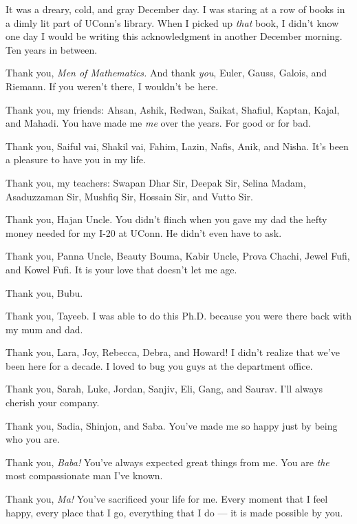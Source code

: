 
  It was a dreary, cold, and gray December day. I was staring at a row of books 
  in a dimly lit part of UConn's library. When I picked up \emph{that} book, I didn't 
  know one day I would be writing this acknowledgment in another December morning. 
  Ten years in between.

  Thank you, \emph{Men of Mathematics.} And thank \emph{you}, 
  Euler, Gauss, Galois, and Riemann. If you weren't there, 
  I wouldn't be here.

  Thank you, my friends: Ahsan, Ashik, Redwan, Saikat, Shafiul, Kaptan, Kajal, and Mahadi. 
  You have made me \emph{me} over the years. For good or for bad.

  Thank you, Saiful vai, Shakil vai, Fahim, Lazin, Nafis, Anik, and Nisha. 
  It's been a pleasure to have you in my life.

  Thank you, my teachers: Swapan Dhar Sir, Deepak Sir, Selina Madam, Asaduzzaman Sir, Mushfiq Sir, Hossain Sir, and Vutto Sir. 

  Thank you, Hajan Uncle. You didn't flinch when you gave my dad the hefty money 
  needed for my I-20 at UConn. He didn't even have to ask.

  Thank you, Panna Uncle, Beauty Bouma, Kabir Uncle, Prova Chachi, Jewel Fufi, and Kowel Fufi. 
  It is your love that doesn't let me age.

  Thank you, Bubu.

  Thank you, Tayeeb. I was able to do this Ph.D. because you were there back with my mum and dad.

  Thank you, Lara, Joy, Rebecca, Debra, and Howard! I didn't realize that we've been here for a decade. 
  I loved to bug you guys at the department office. 

  Thank you, Sarah, Luke, Jordan, Sanjiv, Eli, Gang, and Saurav. I'll always cherish your company.

  Thank you, Sadia, Shinjon, and Saba. You've made me so happy just by being who you are. 

  Thank you, \emph{Baba!} You've always expected great things from me. You are \emph{the} 
  most compassionate man I've known. 

  Thank you, \emph{Ma!} You've sacrificed your life for me. Every moment that I feel happy, 
  every place that I go, everything that I do --- it is made possible by you. 

